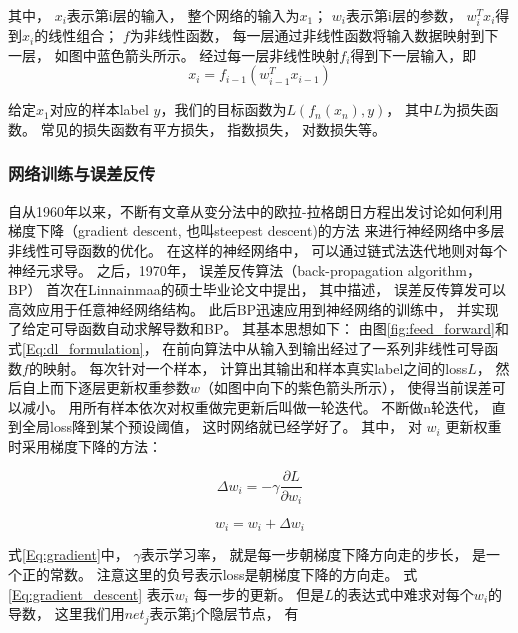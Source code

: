 其中， $x_i$表示第i层的输入， 整个网络的输入为$x_1$； $w_i$表示第i层的参数， $w_i^Tx_i$得到$x_i$的线性组合； $f$为非线性函数， 每一层通过非线性函数将输入数据映射到下一层， 如图中蓝色箭头所示。 经过每一层非线性映射$f_i$得到下一层输入，即
\begin{equation}
 x_i = f_{i-1}(w_{i-1}^Tx_{i-1})
\end{equation}

给定$x_1$对应的样本label $y$，我们的目标函数为$L(f_n(x_n),y)$， 其中$L$为损失函数。 常见的损失函数有平方损失， 指数损失， 对数损失等。 



\subsubsection{网络训练与误差反传}\label{sec:train_net}

自从1960年以来，不断有文章\cite{griewank2012documenta,director1969generalized,gray1965effect,bellman1962applied,
kelley1960cutting,bryson1961diffraction}从变分法中的欧拉-拉格朗日方程出发讨论如何利用梯度下降（gradient descent, 也叫steepest descent)的方法\cite{hadamard1908memoire} 来进行神经网络中多层非线性可导函数的优化。
在这样的神经网络中， 可以通过链式法迭代地则对每个神经元求导\cite{bellman1962applied}。 之后，1970年， 误差反传算法（back-propagation algorithm， BP）\cite{hecht1989theory,goh1995back} 首次在Linnainmaa的硕士毕业论文\cite{linnainmaa1970representation}中提出， 其中描述， 误差反传算发可以高效应用于任意神经网络结构。 此后BP迅速应用到神经网络的训练中， 并实现了给定可导函数自动求解导数和BP\cite{speelpenning1980compiling}。 其基本思想如下： 由图\ref{fig:feed_forward}和式\ref{Eq:dl_formulation}， 在前向算法中从输入到输出经过了一系列非线性可导函数$f$的映射。  每次针对一个样本， 计算出其输出和样本真实label之间的loss$L$， 然后自上而下逐层更新权重参数$w$（如图中向下的紫色箭头所示）， 使得当前误差可以减小。 用所有样本依次对权重做完更新后叫做一轮迭代。 不断做n轮迭代， 直到全局loss降到某个预设阈值， 这时网络就已经学好了。 其中， 对 $w_i$ 更新权重时采用梯度下降的方法：

\begin{equation}
\label{Eq:gradient}
	\Delta w_i = -\gamma \frac{\partial L}{\partial w_i}
\end{equation}

\begin{equation}
\label{Eq:gradient_descent}
	w_i = w_i + \Delta w_i
\end{equation}

式\ref{Eq:gradient}中， $\gamma$表示学习率， 就是每一步朝梯度下降方向走的步长， 是一个正的常数。 注意这里的负号表示loss是朝梯度下降的方向走。 式\ref{Eq:gradient_descent} 表示$w_i$ 每一步的更新。 但是$L$的表达式中难求对每个$w_i$的导数， 这里我们用$net_{j}$表示第j个隐层节点， 有


